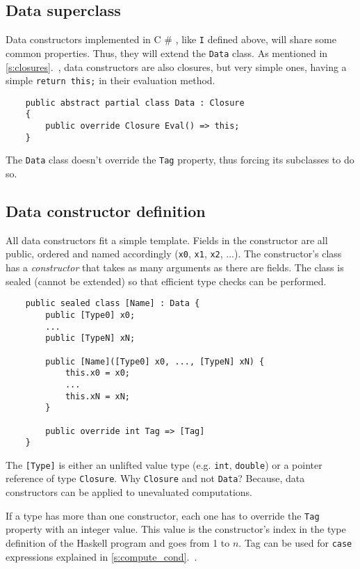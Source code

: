 \documentclass[en]{pracamgr}
\newcommand{\shrp}{%
  {\fontfamily{ppl}\selectfont\#%
  }}
\newcommand{\myref}[1]{\ref{#1}.~\textit{\nameref{#1}}}
\begin{document}
\subsection{Data superclass}

Data constructors implemented in C\shrp{}, like \texttt{I} defined above,
will share some common properties. Thus, they will extend the \texttt{Data} class.
As mentioned in \myref{s:closures}, data constructors are
also closures, but very simple ones, having a simple
\texttt{return this;} in their evaluation method.

\begin{verbatim}
    public abstract partial class Data : Closure
    {
        public override Closure Eval() => this;
    }
\end{verbatim}

The \texttt{Data} class doesn't override the \texttt{Tag}
property, thus forcing its subclasses to do so.

\subsection{Data constructor definition}

All data constructors fit a simple template.
Fields in the constructor are all public, ordered and named accordingly
(\texttt{x0}, \texttt{x1}, \texttt{x2}, ...).
The constructor's class has a \textit{constructor} that takes
as many arguments as there are fields.
The class is sealed (cannot be extended) so that efficient
type checks can be performed.

\begin{verbatim}
    public sealed class [Name] : Data {
        public [Type0] x0;
        ...
        public [TypeN] xN;

        public [Name]([Type0] x0, ..., [TypeN] xN) {
            this.x0 = x0;
            ...
            this.xN = xN;
        }

        public override int Tag => [Tag]
    }
\end{verbatim}

The \verb|[Type]| is either an unlifted value type
(e.g. \texttt{int}, \texttt{double}) or a pointer reference
of type \texttt{Closure}. Why \texttt{Closure} and not \texttt{Data}?
Because, data constructors can be applied to unevaluated computations.

If a type has more than one constructor, each one has to
override the \texttt{Tag} property with an integer value.
This value is the constructor's index in the type definition of
the Haskell program and goes from 1 to $n$.
Tag can be used for \texttt{case} expressions explained in \myref{s:compute_cond}.
\end{document}
